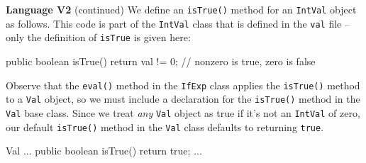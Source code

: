 \begin{minipage}[t]{\sw}
\slidenumber
\LARGE
{\bf Language V2} (continued)\exx
We define an \verb'isTrue()' method for an \verb'IntVal' object as follows.
This code is part of the \verb'IntVal' class that is defined
in the \verb'val' file --
only the definition of \verb'isTrue' is given here:
{\Large
\begin{qv}
public boolean isTrue() {
    return val != 0; // nonzero is true, zero is false
}
\end{qv}
}
Observe that the \verb'eval()' method in the \verb'IfExp' class applies
the \verb'isTrue()' method to a \verb'Val' object,
so we must include a declaration for the \verb'isTrue()' method
in the \verb'Val' base class.
Since we treat {\em any} \verb'Val' object as true
if it's not an \verb'IntVal' of zero,
our default \verb'isTrue()' method in the \verb'Val' class defaults
to returning \verb'true'.
{\Large
\begin{qv}
Val
...
    public boolean isTrue() {
        return true;
    }
...
\end{qv}
}
\end{minipage}
